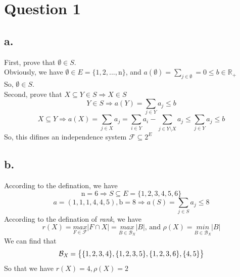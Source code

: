 \documentclass{article}
\begin{document}
\pagestyle{fancy}

\section*{Question 1}{
    \subsection*{a.}{
        First, prove that \(\emptyset \in \mathit{S}\).\\
        Obviously, we have \(\emptyset \in \mathit{E}=\{\mathrm{1,2,...,n}\}\), and \(\mathit{a}(\emptyset)=\sum_{\mathit{j} \in \emptyset}=\mathrm{0} \leqslant \mathit{b} \in \mathbb{R}_{+}\)\\
        So, \(\emptyset \in \mathit{S}\).\\
        Second, prove that \(\mathit{X} \subseteq \mathit{Y} \in \mathit{S} \Rightarrow \mathit{X} \in \mathit{S}\)\\
        \[\mathit{Y} \in \mathit{S} \Rightarrow \mathit{a}(\mathit{Y}) = \sum_{\mathit{j} \in \mathit{Y}}\mathit{a_j} \leqslant \mathit{b}\]
        \[\mathit{X} \subseteq \mathit{Y} \Rightarrow \mathit{a}(\mathit{X}) = \sum_{\mathit{j} \in \mathit{X}}\mathit{a_j} = \sum_{\mathit{i} \in \mathit{Y}}\mathit{a_i} - \sum_{\mathit{j} \in \mathit{Y} \setminus \mathit{X}}\mathit{a_j} \leqslant \sum_{\mathit{j} \in \mathit{Y}}\mathit{a_j} \leqslant \mathit{b}\]
        So, this difines an independence system \(\mathcal{F}\subseteq \mathrm{2}^{\mathit{E}}\)
    }
    \subsection*{b.}{
        According to the defination, we have
        \[\mathrm{n=6} \Rightarrow \mathit{S} \subseteq \mathit{E} = \{ \mathrm{1,2,3,4,5,6}\}\]
        \[\mathit{a}=\mathrm{(1,1,1,4,4,5), b=8} \Rightarrow \mathit{a}(\mathit{S}) = \sum_{\mathit{j} \in \mathit{S}}\mathit{a_j} \leqslant \mathrm{8}\]
        According to the defination of \textit{rank}, we have
        \[\mathit{r(X)}=\underset{\mathit{F} \in \mathcal{F}}{\mathit{max}} \lvert \mathit{F} \cap \mathit{X} \rvert=\underset{\mathit{B} \in \mathcal{B}_{\mathit{X}}} {\mathit{max}} \lvert \mathit{B} \rvert \text{, and } \mathit{\rho(X)} = \underset{\mathit{B} \in \mathcal{B}_{\mathit{X}}} {\mathit{min}} \lvert \mathit{B} \rvert\]
        We can find that
        \[\mathcal{B}_{\mathit{X}} = \mathrm{\big{\{} \{1,2,3,4\}, \{1,2,3,5\}, \{1,2,3,6\}, \{4,5\}\big{\}}}\]
        So that we have \(\mathit{r(X)}=\mathrm{4}, \mathit{\rho(X)}=\mathrm{2}\)
    }
}
\end{document}
